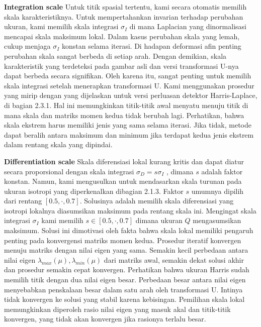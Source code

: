 \textbf{Integration scale} Untuk titik spasial tertentu, kami secara otomatis memilih skala karakteristiknya. Untuk mempertahankan invarian terhadap perubahan ukuran, kami memilih skala integrasi \(\sigma_{I}\) di mana Laplacian yang dinormalisasi mencapai skala maksimum lokal. Dalam kasus perubahan skala yang lemah, cukup menjaga \(\sigma_{I}\) konstan selama iterasi. Di hadapan deformasi afin penting perubahan skala sangat berbeda di setiap arah. Dengan demikian, skala karakteristik yang terdeteksi pada gambar asli dan versi transformasi U-nya dapat berbeda secara signifikan. Oleh karena itu, sangat penting untuk memilih skala integrasi setelah menerapkan transformasi U. Kami menggunakan prosedur yang mirip dengan yang dijelaskan untuk versi perluasan detektor Harris-Laplace, di bagian 2.3.1. Hal ini memungkinkan titik-titik awal menyatu menuju titik di mana skala dan matriks momen kedua tidak berubah lagi. Perhatikan, bahwa skala ekstrem harus memiliki jenis yang sama selama iterasi. Jika tidak, metode dapat beralih antara maksimum dan minimum jika terdapat kedua jenis ekstrem dalam rentang skala yang dipindai.

\textbf{Differentiation scale} Skala diferensiasi lokal kurang kritis dan dapat diatur secara proporsional dengan skala 
integrasi \(\sigma_{D} = s \sigma_{I}\) , dimana \(s\) adalah faktor konstan. Namun, kami mengusulkan untuk mendasarkan skala 
turunan pada ukuran isotropi yang diperkenalkan dibagian 2.1.3. Faktor \(s\) umumnya dipilih dari rentang \([0.5, \cdot , 0.7]\). 
Solusinya adalah memilih skala diferensiasi yang isotropi lokalnya diasumsikan maksimum pada rentang skala ini. 
Mengingat skala integrasi \(\sigma_{I}\) kami memilih \(s \in [0.5,\cdot,0.7]\) dimana ukuran \(Q\) mengasumsikan maksimum. 
Solusi ini dimotivasi oleh fakta bahwa skala lokal memiliki pengaruh penting pada konvergensi matriks momen kedua. 
Prosedur iteratif konvergen menuju matriks dengan nilai eigen yang sama. Semakin kecil perbedaan antara nilai eigen \(\lambda_{max}(\mu),\lambda_{min}(\mu)\) 
dari matriks awal, semakin dekat solusi akhir dan prosedur semakin cepat konvergen. Perhatikan bahwa ukuran Harris sudah memilih titik dengan dua nilai eigen 
besar. Perbedaan besar antara nilai eigen menyebabkan penskalaan besar dalam satu arah oleh transformasi U. 
Intinya tidak konvergen ke solusi yang stabil karena kebisingan. Pemilihan skala lokal memungkinkan diperoleh 
rasio nilai eigen yang masuk akal dan titik-titik konvergen, yang tidak akan konvergen jika rasionya terlalu besar.

